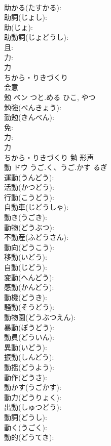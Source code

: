 \documentclass[8pt]{extreport}
\begin{document}
\begin{CJK}{UTF8}{min}
\\	助かる(たすかる): 
\\	助詞(じょし): 
\\	助(じょ): 
\\	助動詞(じょどうし): 
\\	且: 
\\	力: 
\\	力	
\\	ちから・りきづくり	
\\	会意 
\\	勉	ベン	つと.める	ひこ, やつ	
\\	勉強(べんきょう): 
\\	勤勉(きんべん): 
\\	免: 
\\	力: 
\\	力	
\\	ちから・りきづくり	勉	形声 
\\	動	ドウ	うご.く、うご.かす	るぎ	
\\	運動(うんどう): 
\\	活動(かつどう): 
\\	行動(こうどう): 
\\	自動車(じどうしゃ): 
\\	動き(うごき): 
\\	動物(どうぶつ): 
\\	不動産(ふどうさん): 
\\	動向(どうこう): 
\\	移動(いどう): 
\\	自動(じどう): 
\\	変動(へんどう): 
\\	感動(かんどう): 
\\	動機(どうき): 
\\	騒動(そうどう): 
\\	動物園(どうぶつえん): 
\\	暴動(ぼうどう): 
\\	動員(どういん): 
\\	異動(いどう): 
\\	振動(しんどう): 
\\	動揺(どうよう): 
\\	動作(どうさ): 
\\	動かす(うごかす): 
\\	動力(どうりょく): 
\\	出動(しゅつどう): 
\\	動詞(どうし): 
\\	動く(うごく): 
\\	動的(どうてき): 

\end{CJK}
\end{document}
